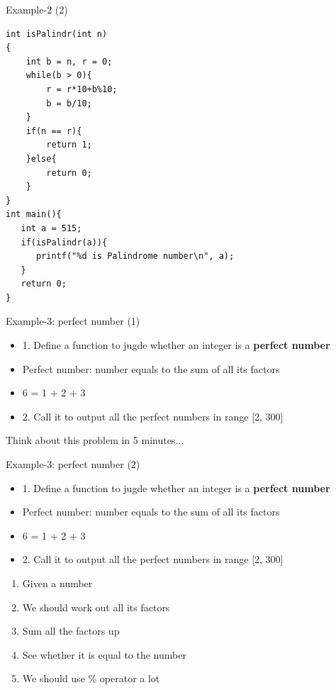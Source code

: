 \begin{frame}[fragile]{Example-2 (2)}
\begin{lstlisting}
int isPalindr(int n)
{
    int b = n, r = 0;
    while(b > 0){
        r = r*10+b%10;
        b = b/10;
    }
    if(n == r){
        return 1;
    }else{
        return 0;
    }
}
int main(){
   int a = 515;
   if(isPalindr(a)){
      printf("%d is Palindrome number\n", a);
   }
   return 0;
}
\end{lstlisting}
\end{frame}



\begin{frame}[fragile]{Example-3: perfect number (1)}
\begin{itemize}
	\item {1. Define a function to jugde whether an integer is a \textbf{perfect number}}
	\item {Perfect number: number equals to the sum of all its factors}
	\item {6 = 1 + 2 + 3}
	\item {2. Call it to output all the perfect numbers in range [2, 300]}
\end{itemize}
\begin{center}
	\Large{Think about this problem in 5 minutes...}
\end{center}
\end{frame}

\begin{frame}[fragile]{Example-3: perfect number (2)}
\begin{itemize}
	\item {1. Define a function to jugde whether an integer is a \textbf{perfect number}}
	\item {Perfect number: number equals to the sum of all its factors}
	\item {6 = 1 + 2 + 3}
	\item {2. Call it to output all the perfect numbers in range [2, 300]}
\end{itemize}
\begin{enumerate}
	\item {Given a number}
	\item {We should work out all its factors}
	\item {Sum all the factors up}
	\item {See whether it is equal to the number}
	\item {We should use \% operator a lot}
\end{enumerate}
\end{frame}

